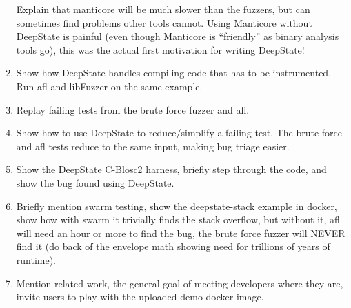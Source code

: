\documentclass[sigconf]{acmart}
\begin{document}
\begin{enumerate}
  Explain that manticore will be much slower than the fuzzers, but can sometimes find problems other tools cannot.  Using Manticore without DeepState is painful (even though Manticore is ``friendly'' as binary analysis tools go), this was the actual first motivation for writing DeepState!

\item Show how DeepState handles compiling code that has to be instrumented.  Run afl and libFuzzer on the same example.
  
\item Replay failing tests from the brute force fuzzer and afl.

\item Show how to use DeepState to reduce/simplify a failing test.  The brute force and afl tests reduce to the same input, making bug triage easier.

\item Show the DeepState C-Blosc2 harness, briefly step through the code, and show the bug found using DeepState.

\item Briefly mention swarm testing, show the deepstate-stack example in docker, show how with swarm it trivially finds the stack overflow, but without it, afl will need an hour or more to find the bug, the brute force fuzzer will NEVER find it (do back of the envelope math showing need for trillions of years of runtime).
  
\item Mention related work, the general goal of meeting developers where they are, invite users to play with the uploaded demo docker image.

\end{enumerate}
\end{document}
